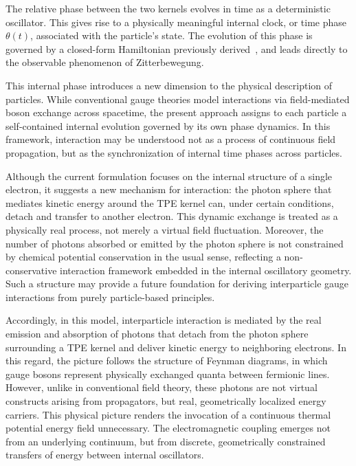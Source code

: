 \documentclass[%
 reprint,
 amsmath,amssymb,
 aps,
]{revtex4-1}
\numberwithin{equation}{section}%
\begin{document}
The relative phase between the two kernels evolves in time as a deterministic oscillator. This gives rise to a physically meaningful internal clock, or time phase $\theta(t)$, associated with the particle’s state. The evolution of this phase is governed by a closed-form Hamiltonian previously derived~\cite{hanamura2023}, and leads directly to the observable phenomenon of Zitterbewegung.

This internal phase introduces a new dimension to the physical description of particles. While conventional gauge theories model interactions via field-mediated boson exchange across spacetime, the present approach assigns to each particle a self-contained internal evolution governed by its own phase dynamics. In this framework, interaction may be understood not as a process of continuous field propagation, but as the synchronization of internal time phases across particles.

Although the current formulation focuses on the internal structure of a single electron, it suggests a new mechanism for interaction: the photon sphere that mediates kinetic energy around the TPE kernel can, under certain conditions, detach and transfer to another electron. This dynamic exchange is treated as a physically real process, not merely a virtual field fluctuation. Moreover, the number of photons absorbed or emitted by the photon sphere is not constrained by chemical potential conservation in the usual sense, reflecting a non-conservative interaction framework embedded in the internal oscillatory geometry. Such a structure may provide a future foundation for deriving interparticle gauge interactions from purely particle-based principles.

Accordingly, in this model, interparticle interaction is mediated by the real emission and absorption of photons that detach from the photon sphere surrounding a TPE kernel and deliver kinetic energy to neighboring electrons. In this regard, the picture follows the structure of Feynman diagrams, in which gauge bosons represent physically exchanged quanta between fermionic lines. However, unlike in conventional field theory, these photons are not virtual constructs arising from propagators, but real, geometrically localized energy carriers. This physical picture renders the invocation of a continuous thermal potential energy field unnecessary. The electromagnetic coupling emerges not from an underlying continuum, but from discrete, geometrically constrained transfers of energy between internal oscillators.
\end{document}
